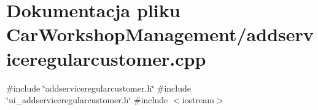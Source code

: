 \section{Dokumentacja pliku Car\+Workshop\+Management/addserviceregularcustomer.cpp}
\label{addserviceregularcustomer_8cpp}
{\ttfamily \#include \char`\"{}addserviceregularcustomer.\+h\char`\"{}}\newline
{\ttfamily \#include \char`\"{}ui\+\_\+addserviceregularcustomer.\+h\char`\"{}}\newline
{\ttfamily \#include $<$iostream$>$}\newline
